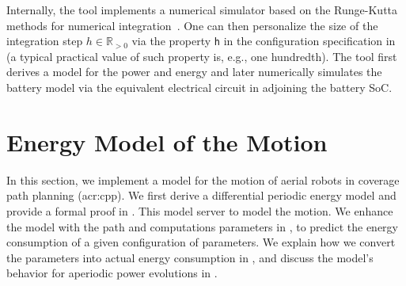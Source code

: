 Internally, the tool implements a numerical simulator based on the Runge-Kutta methods for numerical integration~\citep{iserles2009first}. One can then personalize the size of the integration step $h\in\mathbb{R}_{>0}$ via the property {\small\tt h} in the configuration specification in  (a typical practical value of such property is, e.g., one hundredth). The tool first derives a model for the power and energy and later numerically simulates the battery model via the equivalent electrical circuit in  adjoining the battery SoC.


\section{Energy Model of the Motion}
\label{sec:mot-ener-model}

In this section, we implement a model for the motion of aerial robots in coverage path planning (\Gls{acr:cpp}). We first derive a differential periodic energy model and provide a formal proof in . This model server to model the motion. We enhance the model with the path and computations parameters in , to predict the energy consumption of a given configuration of parameters. We explain how we convert the parameters into actual energy consumption in , and discuss the model's behavior for aperiodic power evolutions in .

